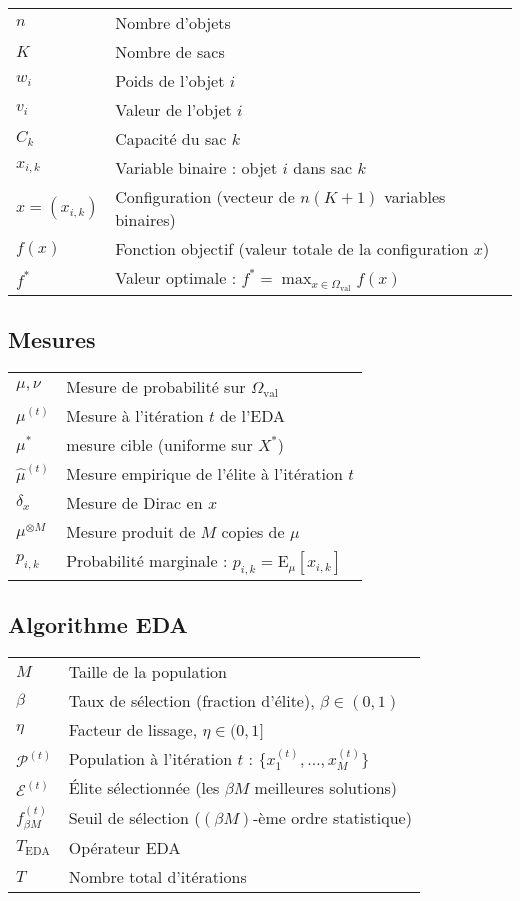 \documentclass[12pt,a4paper]{article}
\theoremstyle{definition}
\theoremstyle{remark}
\newcommand{\E}{\text{E}}
\begin{document}
	\begin{tabular}{ll}
		$n$ & Nombre d'objets \\
		$K$ & Nombre de sacs \\
		$w_i$ & Poids de l'objet $i$ \\
		$v_i$ & Valeur de l'objet $i$ \\
		$C_k$ & Capacité du sac $k$ \\
		$x_{i,k}$ & Variable binaire : objet $i$ dans sac $k$ \\
		$x = (x_{i,k})$ & Configuration (vecteur de $n(K+1)$ variables binaires) \\
		$f(x)$ & Fonction objectif (valeur totale de la configuration $x$) \\
		$f^*$ & Valeur optimale : $f^* = \max_{x \in \Omega_{\text{val}}} f(x)$ \\
	\end{tabular}
	
	\subsection*{ Mesures}
	
	\begin{tabular}{ll}
		$\mu, \nu$ & Mesure de probabilité sur $\Omega_{\text{val}}$ \\
		$\mu^{(t)}$ & Mesure à l'itération $t$ de l'EDA \\
		$\mu^*$ & mesure cible (uniforme sur $X^*$) \\
		$\hat{\mu}^{(t)}$ & Mesure empirique de l'élite à l'itération $t$ \\
		$\delta_x$ & Mesure de Dirac en $x$ \\
		$\mu^{\otimes M}$ & Mesure produit de $M$ copies de $\mu$ \\
		$p_{i,k}$ & Probabilité marginale : $p_{i,k} = \E_\mu[x_{i,k}]$ \\
	\end{tabular}
	
	\subsection*{Algorithme EDA}
	
	\begin{tabular}{ll}
		$M$ & Taille de la population \\
		$\beta$ & Taux de sélection (fraction d'élite), $\beta \in (0,1)$ \\
		$\eta$ & Facteur de lissage, $\eta \in (0,1]$ \\
		$\mathcal{P}^{(t)}$ & Population à l'itération $t$ : $\{x_1^{(t)}, \ldots, x_M^{(t)}\}$ \\
		$\mathcal{E}^{(t)}$ & Élite sélectionnée (les $\beta M$ meilleures solutions) \\
		$f_{\beta M}^{(t)}$ & Seuil de sélection ($(\beta M)$-ème ordre statistique) \\
		$T_{\text{EDA}}$ & Opérateur EDA \\
		$T$ & Nombre total d'itérations \\
	\end{tabular}
	
\end{document}
